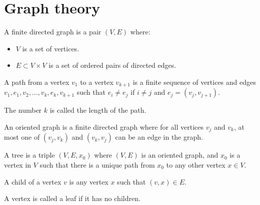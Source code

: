 \section{Graph theory}

\begin{definition}
    A finite directed graph is a pair $(V,E)$ where:
    \begin{itemize}
        \item $V$ is a set of vertices. 
        \item $E \subset V \times V$ is a set of ordered pairs of directed edges.
    \end{itemize}
\end{definition}
\begin{definition}
    A path from a vertex $v_1$ to a vertex $v_{k+1}$ is a finite sequence of vertices and edges $v_1,e_1,v_2,\dots,v_k,e_k,v_{k+1}$ such that $e_i \neq e_j$ if $i \neq j$ and $e_j = (v_j,v_{j+1})$. 
\end{definition}
\noindent The number $k$ is called the length of the path.
\begin{definition}
    An oriented graph is a finite directed graph where for all vertices $v_j$ and $v_k$, at most one of $(v_j,v_k)$ and $(v_k,v_j)$ can be an edge in the graph.
\end{definition}
\begin{definition}
    A tree is a triple $(V,E,x_0)$ where $(V,E)$ is an oriented graph, and $x_0$ is a vertex in $V$ such that there is a unique path from $x_0$ to any other vertex $x \in V$. 
\end{definition}
\begin{definition}
    A child of a vertex $v$ is any vertex $x$ such that $(v,x) \in E$. 
\end{definition}
\begin{definition}
    A vertex is called a leaf if it has no children. 
\end{definition}